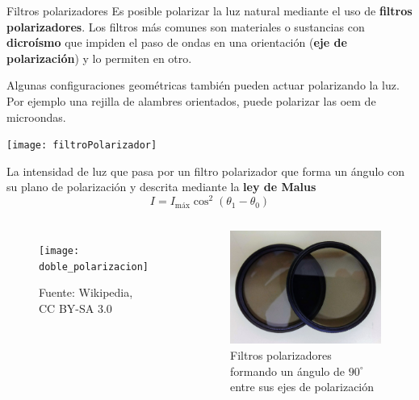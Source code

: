 \documentclass[]{presentation}
\begin{document}
\begin{frame}{Filtros polarizadores}
	Es posible polarizar la luz natural mediante el uso de \textbf{filtros polarizadores}. Los filtros más comunes son materiales o sustancias con \textbf{dicroísmo} que impiden el paso de ondas en una orientación (\textbf{eje de polarización}) y lo permiten en otro.
	
	Algunas configuraciones geométricas también pueden actuar polarizando la luz. Por ejemplo una rejilla de alambres orientados, puede polarizar las oem de microondas.
	\begin{center}
		\texttt{[image: filtroPolarizador]}
	\end{center}
\end{frame}

\begin{frame}
	La intensidad de luz que pasa por un filtro polarizador que forma un ángulo con su plano de polarización y descrita mediante la \textbf{ley de Malus}
	$$
	I = I_\text{máx} \cos^2 (\theta_1 - \theta_0)
	$$
	\begin{columns}
		\begin{figure}
			\centering	
			\texttt{[image: doble\_polarizacion]}
			\caption{\tiny Fuente: Wikipedia, CC BY-SA 3.0}
		\end{figure}
		\begin{figure}
			\centering
			\includegraphics[width=.9\textwidth]{fig/experimentos/polarizacion_ley_de_malus}
			\caption{\justifying Filtros polarizadores formando un ángulo de $90^\circ$ entre sus ejes de polarización}
		\end{figure}
	\end{columns}
\end{frame}
\end{document}
